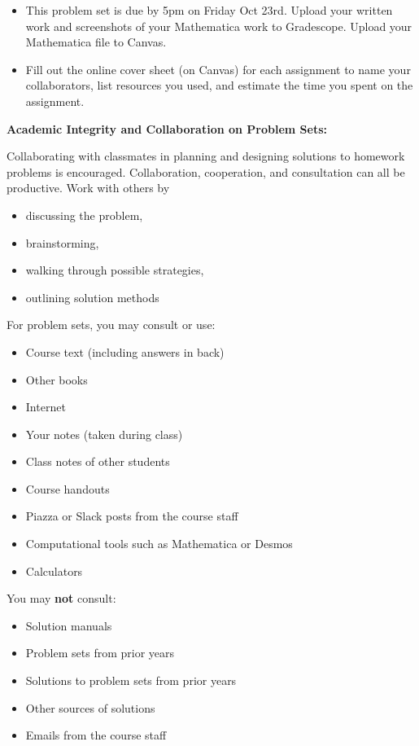 \documentclass[12pt,letterpaper,noanswers]{exam}
\begin{document}
 \pdfpageheight 11in 
  \pdfpagewidth 8.5in
\begin{itemize}
\item This problem set is due by 5pm on Friday Oct 23rd.  Upload your written work and screenshots of your Mathematica work to Gradescope.  Upload your Mathematica file to Canvas.
\item Fill out the online cover sheet (on Canvas) for each assignment to name your collaborators, list resources you used, and estimate the time you spent on the assignment.
\end{itemize}

\noindent\textbf{Academic Integrity and Collaboration on Problem Sets:}  

Collaborating with classmates in planning and designing solutions to homework problems is encouraged.  Collaboration, cooperation, and consultation can all be productive.  Work with others by 
\begin{multicols}{2}
\begin{itemize}
\itemsep-0.2em
    \item discussing the problem,
    \item brainstorming,
    \item walking through possible strategies,
    \item outlining solution methods
\end{itemize}   
\end{multicols}

\noindent For problem sets, you may consult or use:
\begin{multicols}{2}
\begin{itemize}
\itemsep-0.2em
    \item Course text (including answers in back)
    \item Other books
    \item Internet
    \item Your notes (taken during class)
    \item Class notes of other students
    \item Course handouts
    \item Piazza or Slack posts from the course staff
    \item Computational tools such as Mathematica or Desmos
    \item Calculators
\end{itemize}
\end{multicols}

\noindent You may \textbf{not} consult:
\begin{multicols}{2}
\begin{itemize}
\itemsep-0.2em
    \item Solution manuals
    \item Problem sets from prior years
    \item Solutions to problem sets from prior years
    \item Other sources of solutions
    \item Emails from the course staff
\end{itemize}
\end{multicols}
\end{document}
